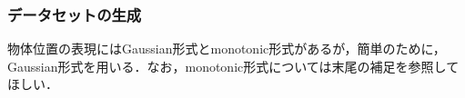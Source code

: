 \subsubsection{データセットの生成}
物体位置の表現にはGaussian形式とmonotonic形式があるが，簡単のために，Gaussian形式を用いる．なお，monotonic形式については末尾の補足を参照してほしい．
